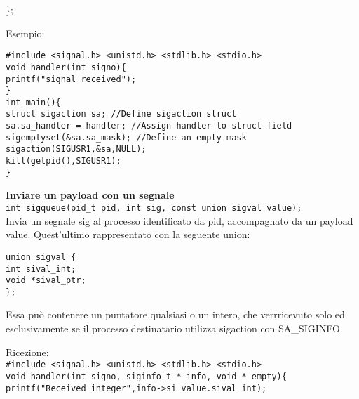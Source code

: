 \begin{flushleft}
\begin{flushleft}
\begin{flushleft}
{      \};}
    \end{flushleft}
    Esempio: \\
    \begin{flushleft}
      \texttt{\#include <signal.h> <unistd.h> <stdlib.h> <stdio.h> \\
      void handler(int signo)\{\\
      \halftab printf("signal received\n");\\
      \}\\
      int main()\{ \\
      \halftab struct sigaction sa; //Define sigaction struct\\
      \halftab sa.sa\_handler = handler; //Assign handler to struct field\\
      \halftab sigemptyset(\&sa.sa\_mask); //Define an empty mask \\
      \halftab sigaction(SIGUSR1,\&sa,NULL);\\
      \halftab kill(getpid(),SIGUSR1);\\
      \}}
    \end{flushleft}
  \end{flushleft}
  \begin{flushleft}
    \textbf{Inviare un payload con un segnale}\\
    \texttt{int sigqueue(pid\_t pid, int sig, const union sigval value);}\\
    Invia un segnale sig al processo identificato da pid, accompagnato da un payload 
    value. Quest'ultimo \ace rappresentato con la seguente union:
    \begin{flushleft}
      \texttt{union sigval \{\\
      \halftab int sival\_int;\\
      \halftab void *sival\_ptr;\\
      \};}
    \end{flushleft}
    Essa può contenere un puntatore qualsiasi o un intero, che verr\aca ricevuto solo ed 
    esclusivamente se il processo destinatario utilizza sigaction con SA\_SIGINFO.
    \begin{flushleft}
      Ricezione: \\
      \texttt{\#include <signal.h> <unistd.h> <stdlib.h> <stdio.h> \\
              void handler(int signo, siginfo\_t * info, void * empty)\{\\
              \halftab printf("Received integer\n",info->si\_value.sival\_int);\\
}
\end{flushleft}
\end{flushleft}
\end{flushleft}
